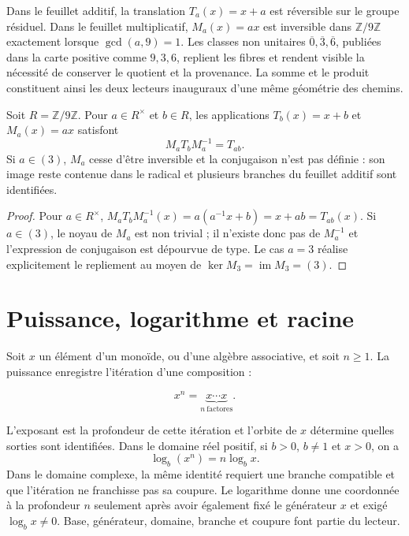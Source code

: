 Dans le feuillet additif, la translation \(T_a(x)=x+a\) est réversible sur le groupe
résiduel. Dans le feuillet multiplicatif, \(M_a(x)=ax\) est inversible dans
\(\mathbb Z/9\mathbb Z\) exactement lorsque \(\gcd(a,9)=1\). Les classes non
unitaires \(\overline0,\overline3,\overline6\), publiées dans la carte
positive comme \(9,3,6\), replient les fibres et rendent visible la nécessité de
conserver le quotient et la provenance. La somme et le produit constituent ainsi les deux
lecteurs inauguraux d'une même géométrie des chemins.

\begin{lemma}
\label{lem:conjugacion-afin-app-rev3}
Soit \(R=\mathbb Z/9\mathbb Z\). Pour \(a\in R^\times\) et \(b\in R\), les
applications \(T_b(x)=x+b\) et \(M_a(x)=ax\) satisfont
\begin{equation}
 M_aT_bM_a^{-1}=T_{ab}.
 \label{eq:conjugacion-afin-app-rev3}
\end{equation}
Si \(a\in(3)\), \(M_a\) cesse d'être inversible et la conjugaison n'est pas
définie : son image reste contenue dans le radical et plusieurs branches du feuillet
additif sont identifiées.
\end{lemma}

\begin{proof}
Pour \(a\in R^\times\),
\(
 M_aT_bM_a^{-1}(x)=a(a^{-1}x+b)=x+ab=T_{ab}(x)
\).
Si \(a\in(3)\), le noyau de \(M_a\) est non trivial ; il n'existe donc pas de
\(M_a^{-1}\) et l'expression de conjugaison est dépourvue de type. Le cas
\(a=3\) réalise explicitement le repliement au moyen de
\(\ker M_3=\operatorname{im}M_3=(3)\).
\end{proof}

\section{Puissance, logarithme et racine}

Soit \(x\) un élément d'un monoïde, ou d'une algèbre associative, et soit
\(n\geq1\). La puissance enregistre l'itération d'une composition :

\[
 x^n=\underbrace{x\cdots x}_{n\ \mathrm{factores}}.
\]

L'exposant est la profondeur de cette itération et l'orbite de \(x\) détermine
quelles sorties sont identifiées. Dans le domaine réel positif, si \(b>0\),
\(b\neq1\) et \(x>0\), on a
\[
 \log_b(x^n)=n\log_b x.
\]
Dans le domaine complexe, la même identité requiert une branche compatible et
que l'itération ne franchisse pas sa coupure. Le logarithme donne une coordonnée à la profondeur
\(n\) seulement après avoir également fixé le générateur \(x\) et exigé
\(\log_b x\neq0\). Base, générateur, domaine, branche et coupure font partie du
lecteur.

